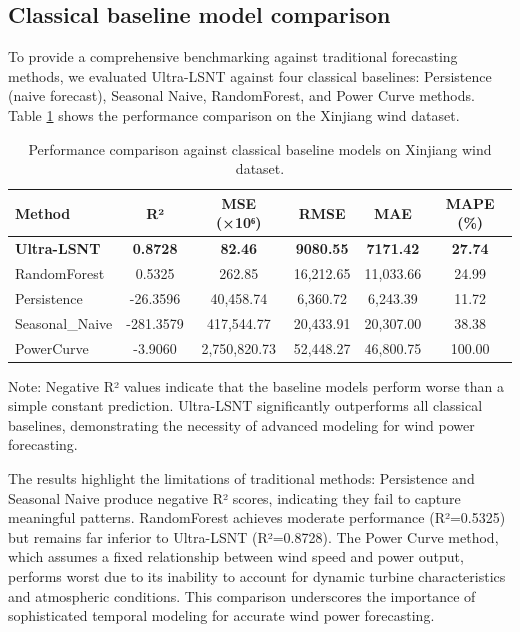 \documentclass[review,3p,times,draft]{elsarticle}
\begin{document}
\subsection{Classical baseline model comparison}
To provide a comprehensive benchmarking against traditional forecasting methods, we evaluated Ultra-LSNT against four classical baselines: Persistence (naive forecast), Seasonal Naive, RandomForest, and Power Curve methods. Table \ref{tab:classical_baselines} shows the performance comparison on the Xinjiang wind dataset.

\begin{table}[htbp]
\centering
\caption{Performance comparison against classical baseline models on Xinjiang wind dataset.}
\label{tab:classical_baselines}
\begin{tabular}{@{}lccccc@{}}
\toprule
\textbf{Method} & \textbf{R²} & \textbf{MSE (×10⁶)} & \textbf{RMSE} & \textbf{MAE} & \textbf{MAPE (\%)} \\
\midrule
\textbf{Ultra-LSNT} & \textbf{0.8728} & \textbf{82.46} & \textbf{9080.55} & \textbf{7171.42} & \textbf{27.74} \\
RandomForest & 0.5325 & 262.85 & 16,212.65 & 11,033.66 & 24.99 \\
Persistence & -26.3596 & 40,458.74 & 6,360.72 & 6,243.39 & 11.72 \\
Seasonal\_Naive & -281.3579 & 417,544.77 & 20,433.91 & 20,307.00 & 38.38 \\
PowerCurve & -3.9060 & 2,750,820.73 & 52,448.27 & 46,800.75 & 100.00 \\
\bottomrule
\end{tabular}
\begin{tablenotes}
\small
\item Note: Negative R² values indicate that the baseline models perform worse than a simple constant prediction. Ultra-LSNT significantly outperforms all classical baselines, demonstrating the necessity of advanced modeling for wind power forecasting.
\end{tablenotes}
\end{table}

The results highlight the limitations of traditional methods: Persistence and Seasonal Naive produce negative R² scores, indicating they fail to capture meaningful patterns. RandomForest achieves moderate performance (R²=0.5325) but remains far inferior to Ultra-LSNT (R²=0.8728). The Power Curve method, which assumes a fixed relationship between wind speed and power output, performs worst due to its inability to account for dynamic turbine characteristics and atmospheric conditions. This comparison underscores the importance of sophisticated temporal modeling for accurate wind power forecasting.
\end{document}
